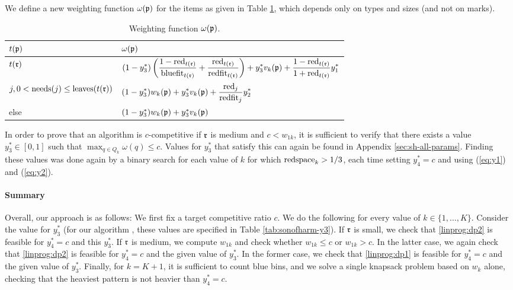We define a new weighting function $\omega(\mathfrak{p})$ for the items as given in Table \ref{tab:weights_knapsack},
which depends only on types and sizes (and not on marks).


\begin{table}[h]
	\caption{Weighting function $\omega(\mathfrak{p})$.}
	\label{tab:weights_knapsack}
	\centering
	\begin{tabular}{l|l}
		$t(\mathfrak{p})$ & $\omega(\mathfrak{p})$\\
		\hline
		$t(\mathfrak{r})$ &
		$\displaystyle
		(1-y_3^*)\left(\frac{1-\mathrm{red}_{t(\mathfrak{r})}}{\mathrm{bluefit}_{t(\mathfrak{r})}} + \frac{\mathrm{red}_{t(\mathfrak{r})}}{\mathrm{redfit}_{t(\mathfrak{r})}}\right) + y_3^* v_{k}(\mathfrak{p}) 
		+ \frac{1-\mathrm{red}_{t(\mathfrak{r})}}{1+\mathrm{red}_{t(\mathfrak{r})}} y_1^*$\\
		$j, 0<\mathrm{needs}(j)\le \mathrm{leaves}(t(\mathfrak{r}))$ & 
		$\displaystyle
		(1-y_3^*)w_{k}(\mathfrak{p}) + y_3^* v_{k}(\mathfrak{p}) + \frac{\mathrm{red}_j}{\mathrm{redfit}_j} y_2^*$
		\\
		else & $(1-y_3^*)w_{k}(\mathfrak{p}) + y_3^* v_{k}(\mathfrak{p})$
	\end{tabular}
\end{table}



In order to prove that an \EHarm{} algorithm is $c$-competitive if {$\mathfrak{r}$  is medium} and $c<w_{1k}$,
it is sufficient to verify that there exists a value
$y_3^*\in[0,1]$ such that $\max_{q\in Q_k} \omega(q)\le c$. {Values for $y_3^*$ that satisfy this can again be found in Appendix \ref{sec:sh-all-params}. Finding these values was done again }
by a binary search for each value of $k$ for which $\mathrm{redspace}_k>1/3$, each time setting $y_4^*=c$ and using (\ref{eq:y1}) and (\ref{eq:y2}). 


\paragraph{Summary}
{
	Overall, our approach is as follows: We first fix a target competitive ratio $c$. We do the following for every value of $k\in\{1,\ldots,K\}.$ Consider the value for $y_3^*$ (for our algorithm \SonofH{}, these values are specified in Table \ref{tab:sonofharm-y3}). If $\mathfrak{r}$  is small, we check that \ref{linprog:dp2} is feasible for $y_4^*=c$ and this $y_3^*$. If $\mathfrak{r}$  is medium, we compute $w_{1k}$ and check whether $w_{1k} \le c$ or $w_{1k} > c$. In the latter case, we again check that \ref{linprog:dp2} is feasible for $y_4^*=c$ and the given value of $y_3^*$. In the former case, we check that \ref{linprog:dp1} is feasible for $y_4^*=c$ and the given value of $y_3^*$.} Finally, for $k=K+1$, it is sufficient to count blue bins, and we solve a single knapsack problem based on $w_k$ alone, {checking that the heaviest pattern is not heavier than $y_4^*=c$.
}



